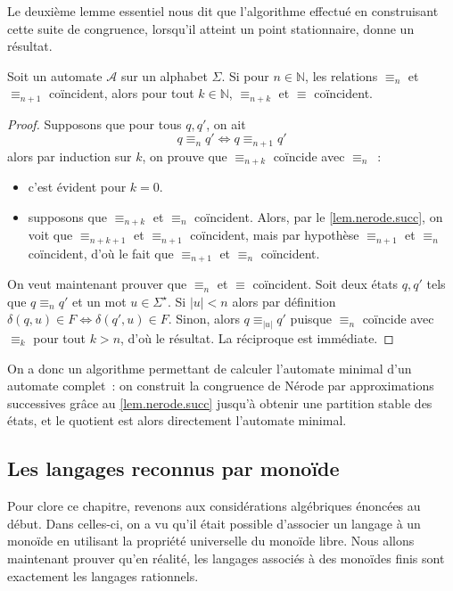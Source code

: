 Le deuxième lemme essentiel nous dit que l'algorithme effectué en construisant
cette suite de congruence, lorsqu'il atteint un point stationnaire, donne un
résultat.

\begin{lemma}
  Soit un automate $\mathcal A$ sur un alphabet $\Sigma$. Si pour
  $n \in \mathbb N$, les relations $\equiv_n$ et $\equiv_{n+1}$ coïncident,
  alors pour tout $k \in \mathbb N$, $\equiv_{n+k}$ et $\equiv$ coïncident.
\end{lemma}

\begin{proof}
  Supposons que pour tous $q,q'$, on ait
  \[q\equiv_n q' \iff q\equiv_{n+1} q'\]
  alors par induction sur $k$, on prouve que $\equiv_{n+k}$ coïncide avec
  $\equiv_n$~:
  \begin{itemize}
  \item c'est évident pour $k = 0$.
  \item supposons que $\equiv_{n+k}$ et $\equiv_n$ coïncident. Alors, par le
    \cref{lem.nerode.succ}, on voit que $\equiv_{n+k+1}$ et $\equiv_{n+1}$
    coïncident, mais par hypothèse $\equiv_{n+1}$ et $\equiv_n$ coïncident,
    d'où le fait que $\equiv_{n+1}$ et $\equiv_n$ coïncident.
  \end{itemize}

  On veut maintenant prouver que $\equiv_n$ et $\equiv$ coïncident. Soit deux
  états $q,q'$ tels que $q\equiv_n q'$ et un mot $u \in \Sigma^\star$. Si
  $|u| < n$ alors par définition $\delta(q,u) \in F \iff \delta(q',u) \in F$.
  Sinon, alors $q\equiv_{|u|} q'$ puisque $\equiv_n$ coïncide avec $\equiv_k$
  pour tout $k > n$, d'où le résultat. La réciproque est immédiate.
\end{proof}

On a donc un algorithme permettant de calculer l'automate minimal d'un automate
complet~: on construit la congruence de Nérode par approximations successives
grâce au \cref{lem.nerode.succ} jusqu'à obtenir une partition stable des états,
et le quotient est alors directement l'automate minimal.

\subsection{Les langages reconnus par monoïde}

Pour clore ce chapitre, revenons aux considérations algébriques énoncées au
début. Dans celles-ci, on a vu qu'il était possible d'associer un langage à un
monoïde en utilisant la propriété universelle du monoïde libre. Nous allons
maintenant prouver qu'en réalité, les langages associés à des monoïdes finis
sont exactement les langages rationnels.
